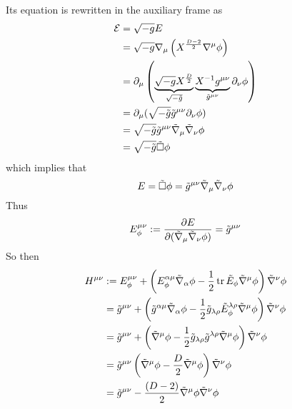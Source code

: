 Its equation is rewritten in the auxiliary frame as
\begin{align}
  \mathcal{E}&=\sqrt{-g}E\\
  &=\sqrt{-g}\nabla_\mu \left(X^{\frac{D-2}{2}}\nabla^\mu \phi \right)\\
  &=\partial_\mu \left(\underbrace{\sqrt{-g}X^\frac{D}{2}}_{\sqrt{-\tilde{g}}}\underbrace{X^{-1}g^{\mu\nu }}_{\tilde{g}^{\mu\nu }}\partial_\nu \phi \right)\\
  &=\partial_\mu (\sqrt{-\tilde{g}}\tilde{g}^{\mu\nu }\partial_\nu \phi )\\
  &=\sqrt{-\tilde{g}}\tilde{g}^{\mu\nu }\tilde{\nabla}_\mu\tilde{\nabla}_\nu\phi \\
  &=\sqrt{-\tilde{g}}\tilde{\Box }\phi 
\end{align}
which implies that
\begin{equation}
  E=\tilde{\Box }\phi =\tilde{g}^{\mu\nu }\tilde{\nabla}_\mu \tilde{\nabla}_\nu\phi 
\end{equation}
Thus
\begin{equation}
  E^{\mu\nu }_\phi :=\pdv{E}{(\tilde{\nabla}_\mu\tilde{\nabla}_\nu\phi)}=\tilde{g}^{\mu\nu }
\end{equation}
So then
\begin{align}
  H^{\mu\nu }&:=E^{\mu\nu }_\phi+\left(E^{\alpha\mu  }_\phi \tilde{\nabla}_\alpha \phi-\frac{1}{2}\tr\tilde{E}_\phi\tilde{\nabla}^\mu\phi \right)\tilde{\nabla}^\nu\phi \notag \\
  &=\tilde{g}^{\mu\nu } +\left(\tilde{g}^{\alpha\mu }\tilde{\nabla}_\alpha\phi -\frac{1}{2}\tilde{g}_{\lambda\rho }\tilde{E}^{\lambda\rho }_\phi \tilde{\nabla}^\mu\phi \right)\tilde{\nabla}^\nu\phi \notag  \\
  &=\tilde{g}^{\mu\nu }+\left(\tilde{\nabla}^\mu\phi-\frac{1}{2}\tilde{g}_{\lambda\rho }\tilde{g}^{\lambda\rho }\tilde{\nabla}^\mu\phi \right)\tilde{\nabla}^\nu\phi \notag \\
  &=\tilde{g}^{\mu\nu }\left(\tilde{\nabla}^\mu\phi -\frac{D}{2}\tilde{\nabla}^\mu\phi \right)\tilde{\nabla}^\nu\phi \notag  \\
  &=\tilde{g}^{\mu\nu }-\frac{(D-2)}{2}\tilde{\nabla}^\mu\phi\tilde{\nabla}^\nu\phi \label{Hmn-auxiliar-frame}
\end{align}

